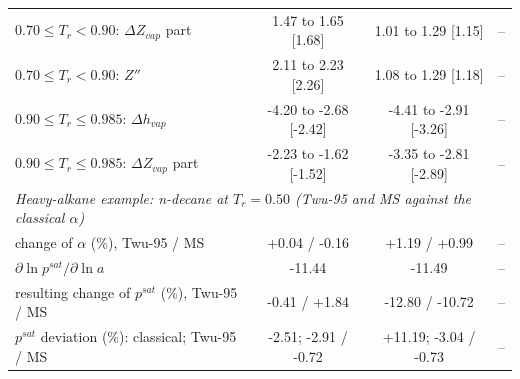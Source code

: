 \begin{table}[H]
\begin{tabular}{p{6.2cm}ccc}
$0.70 \le T_r < 0.90$: $\Delta Z_{vap}$ part & 1.47 to 1.65 [1.68] & 1.01 to 1.29 [1.15] & -- \\
$0.70 \le T_r < 0.90$: $Z''$ & 2.11 to 2.23 [2.26] & 1.08 to 1.29 [1.18] & -- \\
$0.90 \le T_r \le 0.985$: $\Delta h_{vap}$ & -4.20 to -2.68 [-2.42] & -4.41 to -2.91 [-3.26] & -- \\
$0.90 \le T_r \le 0.985$: $\Delta Z_{vap}$ part & -2.23 to -1.62 [-1.52] & -3.35 to -2.81 [-2.89] & -- \\
\multicolumn{4}{l}{\emph{Heavy-alkane example: n-decane at $T_r = 0.50$ (Twu-95 and MS against the classical $\alpha$)}} \\
change of $\alpha$ (\%), Twu-95 / MS & +0.04 / -0.16 & +1.19 / +0.99 & -- \\
$\partial \ln p^{sat}/\partial \ln a$ & -11.44 & -11.49 & -- \\
resulting change of $p^{sat}$ (\%), Twu-95 / MS & -0.41 / +1.84 & -12.80 / -10.72 & -- \\
$p^{sat}$ deviation (\%): classical; Twu-95 / MS & -2.51; -2.91 / -0.72 & +11.19; -3.04 / -0.73 & -- \\
\bottomrule
\end{tabular}
\end{table}
